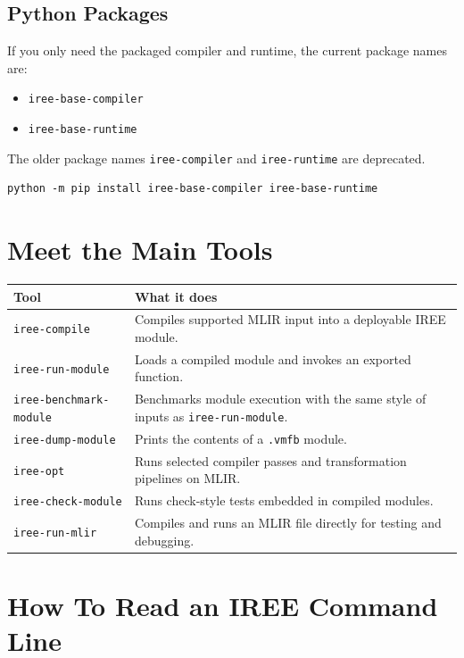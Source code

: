 \documentclass[11pt,a4paper]{article}
\begin{document}
\subsection{Python Packages}

If you only need the packaged compiler and runtime, the current package names are:
\begin{itemize}
    \item \texttt{iree-base-compiler}
    \item \texttt{iree-base-runtime}
\end{itemize}

The older package names \texttt{iree-compiler} and \texttt{iree-runtime} are deprecated.

\begin{lstlisting}[caption=Install the packaged compiler and runtime]
python -m pip install iree-base-compiler iree-base-runtime
\end{lstlisting}

\section{Meet the Main Tools}

\begin{tabular}{|l|p{9cm}|}
\hline
\textbf{Tool} & \textbf{What it does} \\
\hline
\texttt{iree-compile} & Compiles supported MLIR input into a deployable IREE module. \\
\hline
\texttt{iree-run-module} & Loads a compiled module and invokes an exported function. \\
\hline
\texttt{iree-benchmark-module} & Benchmarks module execution with the same style of inputs as \texttt{iree-run-module}. \\
\hline
\texttt{iree-dump-module} & Prints the contents of a \texttt{.vmfb} module. \\
\hline
\texttt{iree-opt} & Runs selected compiler passes and transformation pipelines on MLIR. \\
\hline
\texttt{iree-check-module} & Runs check-style tests embedded in compiled modules. \\
\hline
\texttt{iree-run-mlir} & Compiles and runs an MLIR file directly for testing and debugging. \\
\hline
\end{tabular}

\section{How To Read an IREE Command Line}
\end{document}
